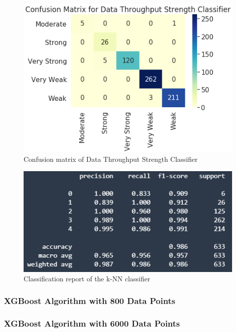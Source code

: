 \begin{figure} [ht]
    \centering
    \includegraphics[scale=1.0]{pages/Chapter 5/Chapter 5 images/knn_6k.PNG}
    \caption{Confusion matrix of Data Throughput Strength Classifier}
    \label{fig_cm1}
\end{figure}


\begin{figure} [ht]
    \centering
    \includegraphics[scale=1.3]{pages/Chapter 5/Chapter 5 images/C_report_knn6k.PNG}
    \caption{Classification report of the k-NN classifier}
    \label{fig_crknn}
\end{figure}

\subsubsection{XGBoost Algorithm with 800 Data Points}

\subsubsection{XGBoost Algorithm with 6000 Data Points}

